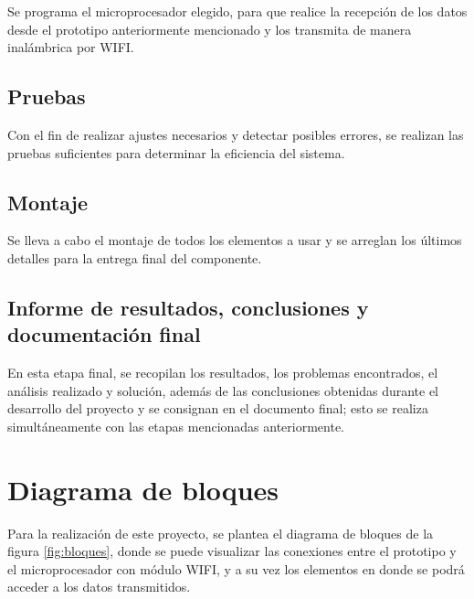 Se programa el microprocesador elegido, para que realice la recepción de los datos desde el prototipo anteriormente mencionado y los transmita de manera inalámbrica por WIFI.  

\subsection{Pruebas}

Con el fin de realizar ajustes necesarios y detectar posibles errores, se realizan las pruebas suficientes para determinar la eficiencia del sistema.

\subsection{Montaje}

Se lleva a cabo el montaje de todos los elementos a usar y se arreglan los últimos detalles para la entrega final del componente. 

\subsection{Informe de resultados, conclusiones y documentación final }

En esta etapa final, se recopilan los resultados, los problemas encontrados, el análisis realizado y solución, además de las conclusiones obtenidas durante el desarrollo del proyecto y se consignan en el documento final; esto se realiza simultáneamente con las etapas mencionadas anteriormente.

\section{Diagrama de bloques}

Para la realización de este proyecto, se plantea el diagrama de bloques de la figura \ref{fig:bloques}, donde se puede visualizar las conexiones entre el prototipo y el microprocesador con módulo WIFI, y a su vez los elementos en donde se podrá acceder a los datos transmitidos.

